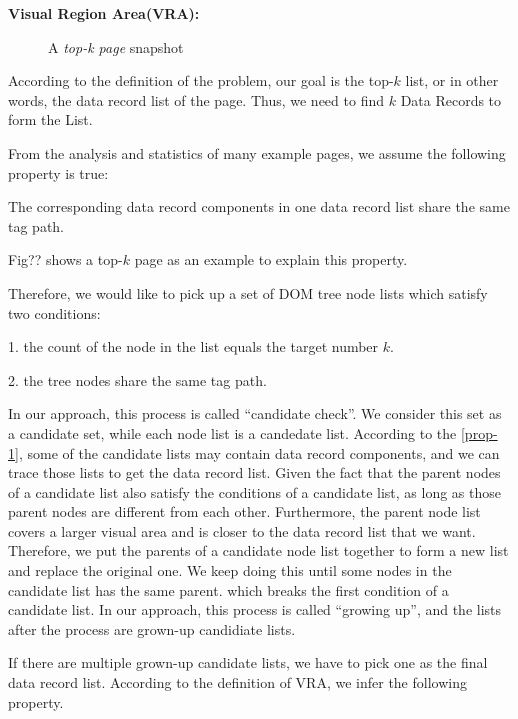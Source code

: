 {\bf Visual Region Area(VRA):}

\begin{figure*}[th]
	\centering
	\caption{A {\em top-k page} snapshot}
	\label{fig:snapshotOfWebPage}
\end{figure*}

According to the definition of the problem, our goal is the top-$k$ list,
or in other words, the data record list of the page.
Thus, we need to find $k$ Data Records to form the List.

From the analysis and statistics of many example pages, 
we assume the following property is true:

\begin{newproperty}\label{prop-1}
The corresponding data record components in one data record list share the same tag path.
\end{newproperty}

Fig?? shows a top-$k$ page as an example to explain this property.

Therefore, we would like to pick up a set of DOM tree node lists which satisfy two conditions:

1. the count of the node in the list equals the target number $k$.

2. the tree nodes share the same tag path.

In our approach, this process is called ``candidate check''. 
We consider this set as a candidate set, while each node list is a candedate list.
According to the \ref{prop-1}, some of the candidate lists may contain data record components,
and we can trace those lists to get the data record list.
Given the fact that the parent nodes of a candidate list also satisfy the conditions of a candidate list, 
as long as those parent nodes are different from each other.
Furthermore, the parent node list covers a larger visual area 
and is closer to the data record list that we want.
Therefore, 
we put the parents of a candidate node list together to form a new list and replace the original one.
We keep doing this
until some nodes in the candidate list has the same parent.
which breaks the first condition of a candidate list.
In our approach, this process is called ``growing up'', 
and the lists after the process are grown-up candidiate lists.

If there are multiple grown-up candidate lists, we have to pick one as the final data record list.
According to the definition of VRA, we infer the following property.

